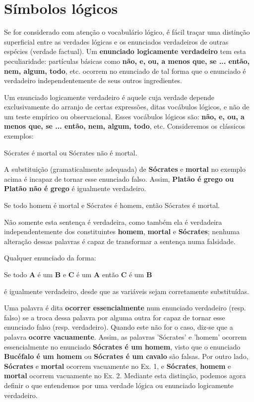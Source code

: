 \section{Símbolos lógicos}

Se for considerado com atenção o vocabulário lógico, é fácil traçar uma distinção superficial entre as verdades lógicas e os enunciados verdadeiros de outras espécies (verdade factual).
Um \textbf{enunciado logicamente verdadeiro} tem esta peculiaridade: partículas básicas como \textbf{não, e, ou, a menos que, se ... então, nem, algum, todo}, etc. ocorrem no enunciado de tal forma que o enunciado é verdadeiro independentemente de seus outros ingredientes.

Um enunciado logicamente verdadeiro é aquele cuja verdade depende exclusivamente do arranjo de certas expressões, ditas vocábulos lógicos, e não de um teste empírico ou observacional.
Esses vocábulos lógicos são: \textbf{não, e, ou, a menos que, se ... então, nem, algum, todo}, etc.
Consideremos os clássicos exemplos:

\bigskip
\begin{exemplo} Sócrates é mortal ou Sócrates não é mortal.
\end{exemplo}

\bigskip
\noindent
A substituição (gramaticalmente adequada) de \textbf{Sócrates} e \textbf{mortal} no exemplo acima é incapaz de tornar esse enunciado falso.
Assim, \textbf{Platão é grego ou Platão não é grego} é igualmente verdadeiro.

\bigskip
\begin{exemplo} Se todo homem é mortal e Sócrates é homem, então Sócrates é mortal.
\end{exemplo}

\bigskip
\noindent
Não somente esta sentença é verdadeira, como também ela é verdadeira independentemente dos constituintes \textbf{homem}, \textbf{mortal} e \textbf{Sócrates}; nenhuma alteração dessas palavras é capaz de transformar a sentença numa falsidade.
\newpage

\noindent Qualquer enunciado da forma:

Se todo \textbf{A} é um \textbf{B} e \textbf{C} é um \textbf{A} então \textbf{C} é um \textbf{B}

\noindent é igualmente verdadeiro, desde que as variáveis sejam corretamente substituídas.

Uma palavra é dita \textbf{ocorrer essencialmente} num enunciado verdadeiro (resp. falso) se a troca dessa palavra por alguma outra for capaz de tornar esse enunciado falso (resp. verdadeiro).
Quando este não for o caso, diz-se que a palavra \textbf{ocorre vacuamente}.
Assim, as palavras 'Sócrates' e 'homem' ocorrem essencialmente no enunciado \textbf{Sócrates é um homem}, visto que o enunciado \textbf{Bucéfalo é um homem} ou \textbf{Sócrates é um cavalo} são falsas.
Por outro lado, \textbf{Sócrates} e \textbf{mortal} ocorrem vacuamente no Ex. 1, e \textbf{Sócrates}, \textbf{homem} e \textbf{mortal} ocorrem vacuamente no Ex. 2.
Mediante esta distinção, podemos agora definir o que entendemos por uma verdade lógica ou enunciado logicamente verdadeiro.

